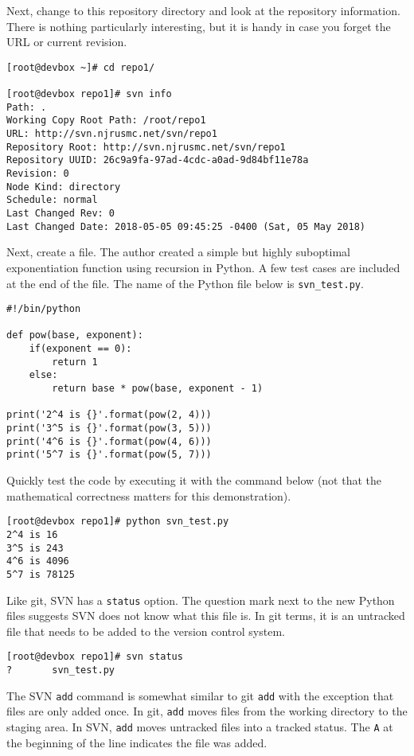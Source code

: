 Next, change to this repository directory and look at the repository
information. There is nothing particularly interesting, but it is handy in
case you forget the URL or current revision.

\begin{verbatim}
[root@devbox ~]# cd repo1/

[root@devbox repo1]# svn info
Path: .
Working Copy Root Path: /root/repo1
URL: http://svn.njrusmc.net/svn/repo1
Repository Root: http://svn.njrusmc.net/svn/repo1
Repository UUID: 26c9a9fa-97ad-4cdc-a0ad-9d84bf11e78a
Revision: 0
Node Kind: directory
Schedule: normal
Last Changed Rev: 0
Last Changed Date: 2018-05-05 09:45:25 -0400 (Sat, 05 May 2018)
\end{verbatim}

Next, create a file. The author created a simple but highly suboptimal
exponentiation function using recursion in Python. A few test cases are
included at the end of the file. The name of the Python file below is
\verb|svn_test.py|.

\begin{verbatim}
#!/bin/python

def pow(base, exponent):
    if(exponent == 0):
        return 1
    else:
        return base * pow(base, exponent - 1)

print('2^4 is {}'.format(pow(2, 4)))
print('3^5 is {}'.format(pow(3, 5)))
print('4^6 is {}'.format(pow(4, 6)))
print('5^7 is {}'.format(pow(5, 7)))
\end{verbatim}

Quickly test the code by executing it with the command below (not that the
mathematical correctness matters for this demonstration).

\begin{verbatim}
[root@devbox repo1]# python svn_test.py 
2^4 is 16
3^5 is 243
4^6 is 4096
5^7 is 78125
\end{verbatim}

Like git, SVN has a \verb|status| option. The question mark next to the new
Python files suggests SVN does not know what this file is. In git terms, it is
an untracked file that needs to be added to the version control system.

\begin{verbatim}
[root@devbox repo1]# svn status
?       svn_test.py
\end{verbatim}

The SVN \verb|add| command is somewhat similar to git \verb|add| with the
exception that files are only added once. In git, \verb|add| moves files from
the working directory to the staging area. In SVN, \verb|add| moves untracked
files into a tracked status. The \verb|A| at the beginning of the line
indicates the file was added.


